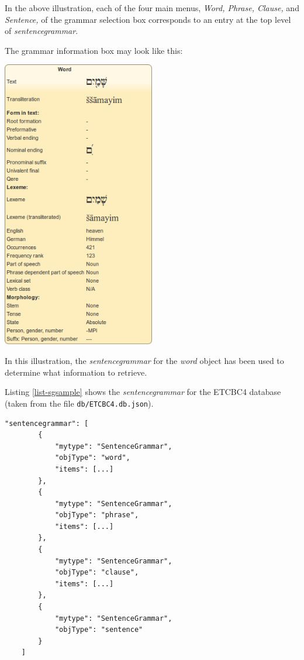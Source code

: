 \documentclass[11pt,oneside,a4paper]{memoir}
\begin{document}
In the above illustration, each of the four main menus, \emph{Word, Phrase, Clause,} and
\emph{Sentence,} of the grammar selection box corresponds to an entry at the top level of
\emph{sentencegrammar}.

The grammar information box may look like this:

\begin{center}
  \includegraphics[width=0.5\textwidth]{grammarinfo.png}
\end{center}

In this illustration, the \emph{sentencegrammar} for the \emph{word} object
has been used to determine what information to retrieve.

Listing \ref{list-sgsample} shows the \emph{sentencegrammar} for the ETCBC4 database (taken from the
file \texttt{db/ETCBC4.db.json}).

\begin{lstlisting}[caption=Condensed sentencegrammar value,label=list-sgsample]
    "sentencegrammar": [
        {
            "mytype": "SentenceGrammar",
            "objType": "word",
            "items": [...]
        },
        {
            "mytype": "SentenceGrammar",
            "objType": "phrase",
            "items": [...]
        },
        {
            "mytype": "SentenceGrammar",
            "objType": "clause",
            "items": [...]
        },
        {
            "mytype": "SentenceGrammar",
            "objType": "sentence"
        }
    ]
\end{lstlisting}
\end{document}
